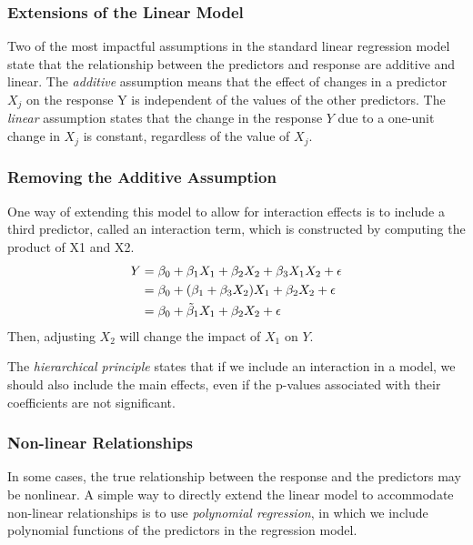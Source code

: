 \documentclass{article}
\begin{document}
\subsubsection{Extensions of the Linear Model}
Two of the most impactful assumptions in the standard linear regression model state that the relationship between the predictors and response are additive and linear. The \textit{additive} assumption means that the effect of changes in a predictor $X_j$ on the response Y is independent of the values of the other predictors. The \textit{linear} assumption states that the change in the response $Y$ due to a one-unit change in $X_j$ is constant, regardless of the value of $X_j$.

\subsubsection*{Removing the Additive Assumption}
One way of extending this model to allow for interaction effects is to include a third predictor, called an interaction term, which is constructed by computing the product of X1 and X2.
\begin{align*}
    Y &= \beta_0 + \beta_1 X_ 1 + \beta_2 X_2 + \beta_3 X_1 X_2 + \epsilon \\
    &= \beta_0 + (\beta_1 + \beta_3 X_2)X_1 + \beta_2 X_2 + \epsilon \\
    &= \beta_0 + \Tilde \beta_1 X_1 + \beta_2 X_2 + \epsilon
\end{align*}
Then, adjusting $X_2$ will change the impact of $X_1$ on $Y$.

The \textit{hierarchical principle} states that if we include an interaction in a model, we should also include the main effects, even if the p-values associated with their coefficients are not significant.
 
\subsubsection*{Non-linear Relationships}
In some cases, the true relationship between the response and the predictors may be nonlinear. A simple way to directly extend the linear model to accommodate non-linear relationships is to use \textit{polynomial regression}, in which we include polynomial functions of the predictors in the regression model.
\end{document}
